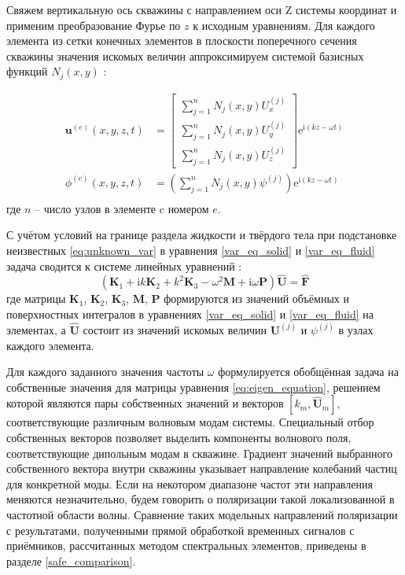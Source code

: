 \documentclass[a4paper,11pt]{article}
\newcommand{\ii}{\mathrm{i}}
\begin{document}
Свяжем вертикальную ось скважины с направлением оси Z системы координат и применим преобразование Фурье по $z$ к исходным уравнениям. Для каждого элемента из сетки конечных элементов в плоскости поперечного сечения скважины значения искомых величин аппроксимируем системой базисных функций $N_j(x,y)$ \cite{Zienkiewicz2000}:

\begin{equation}
\begin{split}
\mathbf{u}^{(e)}(x,y,z,t) &= \left[
\begin{array}{c}
\sum_{j=1}^{n}N_j(x,y)U_{x}^{(j)} \\
\sum_{j=1}^{n}N_j(x,y)U_{y}^{(j)} \\
\sum_{j=1}^{n}N_j(x,y)U_{z}^{(j)} 
\end{array}
\right] \mathrm{e}^{\ii (kz-\omega t)} %
\\
\phi^{(e)}(x,y,z,t) &= \left(\sum_{j=1}^{n}N_j(x,y)\psi^{(j)} \right) \mathrm{e}^{\ii (kz-\omega t)} %
\\
\end{split} \label{eq:unknown_var}
\end{equation}
где $n$ -- число узлов в элементе c номером $e$.  

С учётом условий на границе раздела жидкости и твёрдого тела при подстановке неизвестных \eqref{eq:unknown_var} в уравнения \eqref{var_eq_solid} и \eqref{var_eq_fluid} задача сводится к системе линейных уравнений \cite{Bartoli2006,Treyssede2013}:
\begin{equation}
(\mathbf{K}_1 + \ii k \mathbf{K}_2 + k^2 \mathbf{K}_3 - \omega^2 \mathbf{M} + \ii \omega \mathbf{P}) \hat{\mathbf{U}} = \hat{\mathbf{F}} \label{eq:eigen_equation}
\end{equation}
где матрицы $\mathbf{K}_1$, $\mathbf{K}_2$, $\mathbf{K}_3$, $\mathbf{M}$, $\mathbf{P}$ формируются из значений объёмных и поверхностных интегралов в уравнениях \eqref{var_eq_solid} и \eqref{var_eq_fluid} на элементах, а $ \hat{\mathbf{U}}$ состоит из значений искомых величин $\mathbf{U}^{(j)}$ и $\psi^{(j)}$ в узлах каждого элемента. 

Для каждого заданного значения частоты $\omega$ формулируется обобщённая задача на собственные значения для матрицы уравнения \eqref{eq:eigen_equation}, решением которой являются пары собственных значений и векторов $[k_m, \hat{\mathbf{U}}_m]$, соответствующие различным волновым модам системы. Специальный отбор собственных векторов позволяет выделить компоненты волнового поля, соответствующие дипольным модам в скважине. Градиент значений выбранного собственного вектора внутри скважины указывает направление колебаний частиц для конкретной моды. Если на некотором диапазоне частот эти направления меняются незначительно, будем говорить о поляризации такой локализованной в частотной области волны. Сравнение таких модельных направлений поляризации с результатами, полученными прямой обработкой временных сигналов с приёмников, рассчитанных методом спектральных элементов, приведены в разделе \ref{safe_comparison}.
\end{document}
